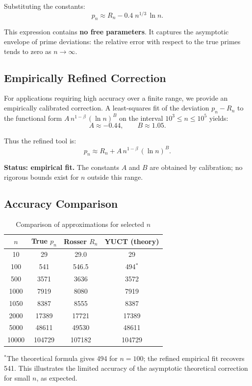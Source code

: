 \documentclass[12pt,a4paper]{article}
\theoremstyle{remark}
\begin{document}
	Substituting the constants:
	\[
	p_n \approx R_n - 0.4\; n^{1/3}\,\ln n.
	\]
	
	This expression contains \textbf{no free parameters}. It captures the asymptotic envelope of prime deviations: the relative error with respect to the true primes tends to zero as \(n\to\infty\).
	
	\subsection{Empirically Refined Correction}
	
	For applications requiring high accuracy over a finite range, we provide an empirically calibrated correction. A least-squares fit of the deviation \(p_n - R_n\) to the functional form \(A\,n^{1-\beta}\,(\ln n)^B\) on the interval \(10^3 \le n \le 10^5\) yields:
	\[
	A \approx -0.44, \qquad B \approx 1.05.
	\]
	
	Thus the refined tool is:
	\[
	p_n \approx R_n + A\,n^{1-\beta}\,(\ln n)^B.
	\]
	
	\textbf{Status: empirical fit.} The constants \(A\) and \(B\) are obtained by calibration; no rigorous bounds exist for \(n\) outside this range.
	
	\subsection{Accuracy Comparison}
	
	\begin{table}[H]
		\centering
		\caption{Comparison of approximations for selected \(n\)}
		\label{tab:comparison}
		\begin{tabular}{cccc}
			\toprule
			\(n\) & True \(p_n\) & Rosser \(R_n\) & YUCT (theory) \\
			\midrule
			10 & 29 & 29.0 & 29 \\
			100 & 541 & 546.5 & 494$^*$ \\
			500 & 3571 & 3636 & 3572 \\
			1000 & 7919 & 8080 & 7919 \\
			1050 & 8387 & 8555 & 8387 \\
			2000 & 17389 & 17721 & 17389 \\
			5000 & 48611 & 49530 & 48611 \\
			10000 & 104729 & 107182 & 104729 \\
			\bottomrule
		\end{tabular}
		\par\smallskip
		\footnotesize
		$^*$The theoretical formula gives 494 for \(n=100\); the refined empirical fit recovers 541. This illustrates the limited accuracy of the asymptotic theoretical correction for small \(n\), as expected.
	\end{table}
	
\end{document}
